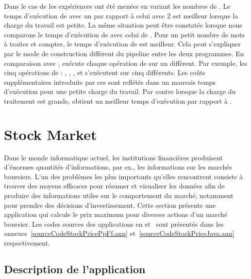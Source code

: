 Dans le cas de  les exp\'eriences ont \'et\'e men\'ees en variant les nombres de . Le temps d'ex\'ecution de  avec un  par rapport \`a celui avec 2  est meilleur lorsque la charge du travail est petite. La m\^eme situation peut \^etre constat\'ee lorsque nous comparons le temps d'ex\'ecution de  avec celui de . Pour un petit nombre de mots \`a traiter et compter, le temps d'ex\'ecution de  est meilleur. Cela peut s'expliquer par le mode de construction diff\'erent du pipeline entre les deux programmes. En comparaison avec ,  ex\'ecute chaque op\'eration de  sur un  diff\'erent. Par exemple, les cinq op\'erations de  : , , ,  et  s'ex\'ecutent sur cinq  diff\'erents. Les co\^uts suppl\'ementaires introduits par ces  sont refl\'et\'es dans un mauvais temps d'ex\'ecution pour une petite charge du travail. Par contre lorsque la charge du traitement est grande,  obtient un meilleur temps d'ex\'ecution par rapport \`a .



\section{Stock Market}
\label{stockprice.sect}


Dans le monde informatique actuel, les institutions financi\`eres produisent d'\'enormes quantit\'es d'informations, par ex., les informations sur les march\'es boursiers. L'un des probl\`emes les plus importants qu'elles rencontrent consiste \`a trouver des moyens efficaces pour r\'esumer et visualiser les donn\'ees afin de produire des informations utiles sur le comportement du march\'e, notamment pour prendre des d\'ecisions d'investissement. Cette section pr\'esente une application qui calcule le prix maximum pour diverses actions d'un marché boursier. Les codes sources des applications  en  et~ sont pr\'esent\'es dans les annexes~\ref{sourceCodeStockPricePpFf.ann} et~\ref{sourceCodeStockPriceJava.ann} respectivement. 

\subsection{Description de l'application}

